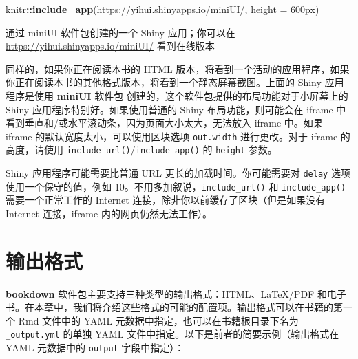 \documentclass[
  12pt,
]{krantz}
\newenvironment{Shaded}{\begin{snugshade}}{\end{snugshade}}
\newcommand{\AttributeTok}[1]{\textcolor[rgb]{0.13,0.29,0.53}{#1}}
\newcommand{\FunctionTok}[1]{\textcolor[rgb]{0.13,0.29,0.53}{\textbf{#1}}}
\newcommand{\NormalTok}[1]{#1}
\newcommand{\SpecialCharTok}[1]{\textcolor[rgb]{0.81,0.36,0.00}{\textbf{#1}}}
\newcommand{\StringTok}[1]{\textcolor[rgb]{0.31,0.60,0.02}{#1}}
\renewcommand{\href}[2]{#2\footnote{\url{#1}}}
\theoremstyle{definition}
\theoremstyle{definition}
\theoremstyle{definition}
\theoremstyle{definition}
\theoremstyle{remark}
\begin{document}
\begin{Shaded}
\begin{Highlighting}[]
\NormalTok{knitr}\SpecialCharTok{::}\FunctionTok{include\_app}\NormalTok{(}\StringTok{\textquotesingle{}https://yihui.shinyapps.io/miniUI/\textquotesingle{}}\NormalTok{, }\AttributeTok{height =} \StringTok{\textquotesingle{}600px\textquotesingle{}}\NormalTok{)}
\end{Highlighting}
\end{Shaded}

\label{fig:miniUI}通过 miniUI 软件包创建的一个 Shiny 应用；你可以在 \url{https://yihui.shinyapps.io/miniUI/} 看到在线版本

\let\href\ooldhref

同样的，如果你正在阅读本书的 HTML 版本，将看到一个活动的应用程序，如果你正在阅读本书的其他格式版本，将看到一个静态屏幕截图。上面的 Shiny 应用程序是使用 \textbf{miniUI} 软件包 \citep{R-miniUI} 创建的，这个软件包提供的布局功能对于小屏幕上的 Shiny 应用程序特别好。如果使用普通的 Shiny 布局功能，则可能会在 iframe 中看到垂直和/或水平滚动条，因为页面大小太大，无法放入 iframe 中。如果 iframe 的默认宽度太小，可以使用区块选项 \texttt{out.width} 进行更改。对于 iframe 的高度，请使用 \texttt{include\_url()}/\texttt{include\_app()} 的 \texttt{height} 参数。

Shiny 应用程序可能需要比普通 URL 更长的加载时间。你可能需要对 \texttt{delay} 选项使用一个保守的值，例如 10。不用多加叙说，\texttt{include\_url()} 和 \texttt{include\_app()} 需要一个正常工作的 Internet 连接，除非你以前缓存了区块（但是如果没有 Internet 连接，iframe 内的网页仍然无法工作）。

\hypertarget{output-formats}{%
\chapter{输出格式}\label{output-formats}}

\textbf{bookdown} 软件包主要支持三种类型的输出格式：HTML、LaTeX/PDF 和电子书。在本章中，我们将介绍这些格式的可能的配置项。输出格式可以在书籍的第一个 Rmd 文件中的 YAML 元数据中指定，也可以在书籍根目录下名为 \texttt{\_output.yml} 的单独 YAML 文件中指定。以下是前者的简要示例（输出格式在 YAML 元数据中的 \texttt{output} 字段中指定）：
\end{document}
